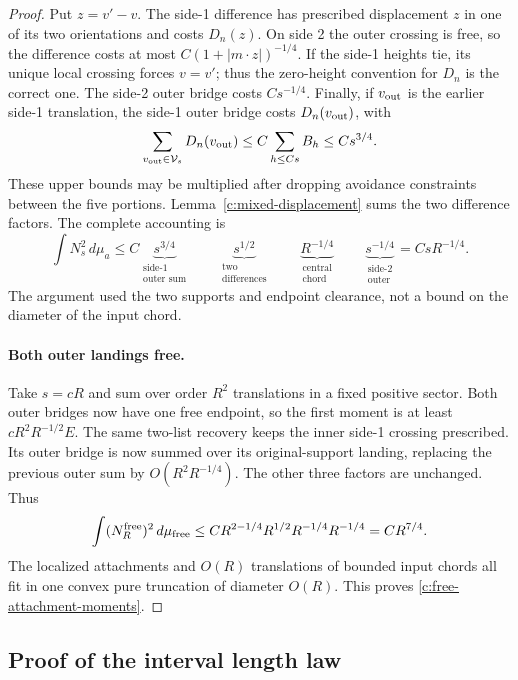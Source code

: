 \begin{proof}
Put $z=v'-v$. The side-1 difference has prescribed displacement $z$
in one of its two orientations and costs $D_n(z)$. On side 2 the outer
crossing is free, so the difference costs at most
$C(1+|m\cdot z|)^{-1/4}$. If the side-1 heights tie, its unique local
crossing forces $v=v'$; thus the zero-height convention for $D_n$ is
the correct one. The side-2 outer bridge costs $Cs^{-1/4}$. Finally,
if $v_{\rm out}$ is the earlier side-1 translation, the side-1 outer
bridge costs $D_n(v_{\rm out})$, with
\[
 \sum_{v_{\rm out}\in\mathcal V_s}D_n(v_{\rm out})
 \le C\sum_{h\le Cs}B_h\le Cs^{3/4}.
\]
These upper bounds may be multiplied after dropping avoidance constraints
between the five portions. Lemma~\ref{c:mixed-displacement} sums the two
difference factors. The complete accounting is
\[
 \int N_s^2\,d\mu_a
 \le C\underbrace{s^{3/4}}_{\substack{\text{side-1}\\\text{outer sum}}}
       \qquad\underbrace{s^{1/2}}_{\substack{\text{two}\\\text{differences}}}
       \qquad\underbrace{R^{-1/4}}_{\substack{\text{central}\\\text{chord}}}
       \qquad\underbrace{s^{-1/4}}_{\substack{\text{side-2}\\\text{outer}}}
 =CsR^{-1/4}.
\]
The argument used the two supports and endpoint clearance, not a bound
on the diameter of the input chord.

\paragraph{Both outer landings free.}
Take $s=cR$ and sum over order $R^2$ translations in a fixed positive
sector. Both outer bridges now have one free endpoint, so the first
moment is at least $cR^2R^{-1/2}E$. The same two-list recovery keeps
the inner side-1 crossing prescribed. Its outer bridge is now summed
over its original-support landing, replacing the previous outer sum by
$O(R^2R^{-1/4})$. The other three factors are unchanged. Thus
\[
 \int(N_R^{\rm free})^2\,d\mu_{\rm free}
 \le CR^{2-1/4}R^{1/2}R^{-1/4}R^{-1/4}=CR^{7/4}.
\]
The localized attachments and $O(R)$ translations of bounded input
chords all fit in one convex pure truncation of diameter $O(R)$.
This proves \eqref{c:free-attachment-moments}.
\end{proof}

\subsection{Proof of the interval length law}

